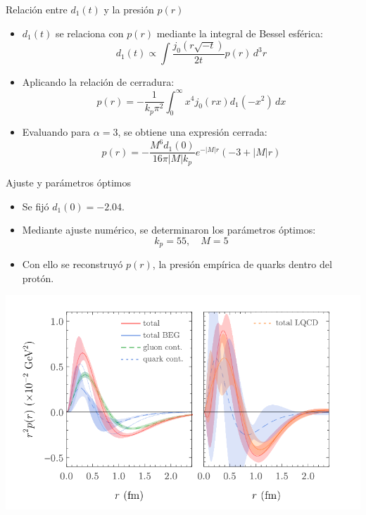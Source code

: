 \documentclass{beamer}
\begin{document}
\begin{frame}{Relación entre \( d_1(t) \) y la presión \( p(r) \)}
  \begin{itemize}
    \item \( d_1(t) \) se relaciona con \( p(r) \) mediante la integral de Bessel esférica:
    \[
      d_1(t) \propto \int \frac{j_0(r\sqrt{-t})}{2t} p(r) \, d^3r
    \]
    \item Aplicando la relación de cerradura:
    \[
      p(r) = -\frac{1}{k_p \pi^2} \int_0^\infty x^4 j_0(rx) d_1(-x^2) \, dx
    \]
    \item Evaluando para \( \alpha = 3 \), se obtiene una expresión cerrada:
    \[
      p(r) = -\frac{M^6 d_1(0)}{16\pi |M| k_p} e^{-|M|r} (-3 + |M|r)
    \]
  \end{itemize}
\end{frame}

\begin{frame}{Ajuste y parámetros óptimos}
  \begin{itemize}
    \item Se fijó \( d_1(0) = -2.04 \).
    \item Mediante ajuste numérico, se determinaron los parámetros óptimos:
    \[
      k_p = 55, \quad M = 5
    \]
    \item Con ello se reconstruyó \( p(r) \), la presión empírica de quarks dentro del protón.
  \end{itemize}
  \centering
  \includegraphics[width=0.6\linewidth]{figures/presion_quark_gff.png}
\end{frame}
\end{document}
